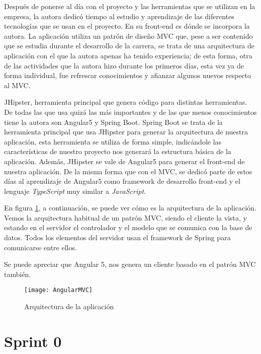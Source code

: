 Después de ponerse al día con el proyecto y las herramientas que se utilizan en la empresa, la autora dedicó tiempo al estudio y aprendizaje de las diferentes tecnologías que se usan en el proyecto. En su front-end es dónde se incorpora la autora. La aplicación utiliza un patrón de diseño MVC que, pese a ser contenido que se estudia durante el desarrollo de la carrera, se trata de una arquitectura de aplicación con el que la autora apenas ha tenido experiencia; de esta forma, otra de las actividades que la autora hizo durante los primeros días, esta vez ya de forma individual, fue refrescar conocimientos y afianzar algunos nuevos respecto al MVC.

JHipster, herramienta principal que genera código para distintas herramientas. De todas las que usa quizá las más importantes y de las que menos conocimientos tiene la autora son Angular5 y Spring Boot. Spring Boot se trata de la herramienta principal que usa JHipster para generar la arquitectura de nuestra aplicación, esta herramienta se utiliza de forma simple, indicándole las características de nuestro proyecto nos generará la estructura básica de la aplicación. Además, JHipster se vale de Angular5 para generar el front-end de nuestra aplicación. De la misma forma que con el MVC, se dedicó parte de estos días al aprendizaje de Angular5 como framework de desarrollo front-end y el lenguaje \emph{TypeScript} muy similar a \emph{JavaScript}.

En figura \ref{fig:angularMVC}, a continuación, se puede ver cómo es la arquitectura de la aplicación. Vemos la arquitectura habitual de un patrón MVC, siendo el cliente la vista, y estando en el servidor el controlador y el modelo que se comunica con la base de datos. Todos los elementos del servidor usan el framework de Spring para comunicarse entre ellos.

Se puede apreciar que Angular 5, nos genera un cliente basado en el patrón MVC también.

\begin{figure}[!h]
\begin{center}
\texttt{[image: AngularMVC]}
\caption{Arquitectura de la aplicación}
\label{fig:angularMVC}
\end{center}
\end{figure}

\section{Sprint 0}
\label{sec:sprint0}

